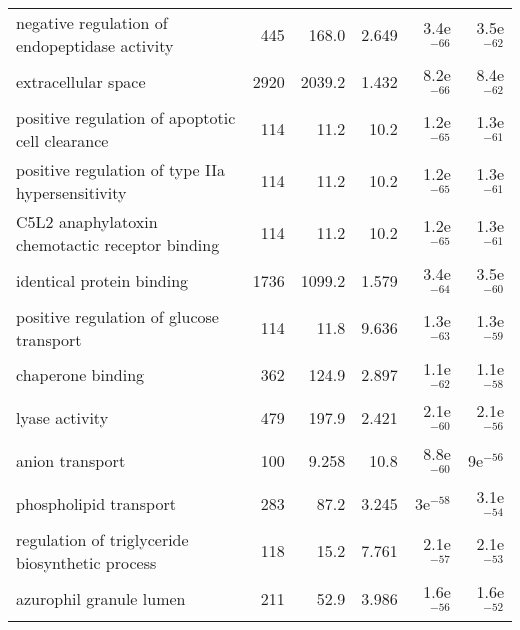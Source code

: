 \begin{longtable}{lrrrrr}
     negative regulation of endopeptidase activity &                     445 &                   168.0 &      2.649 &         3.4e$^{-66}$ &         3.5e$^{-62}$ \\
                               extracellular space &                    2920 &                  2039.2 &      1.432 &         8.2e$^{-66}$ &         8.4e$^{-62}$ \\
   positive regulation of apoptotic cell clearance &                     114 &                    11.2 &       10.2 &         1.2e$^{-65}$ &         1.3e$^{-61}$ \\
  positive regulation of type IIa hypersensitivity &                     114 &                    11.2 &       10.2 &         1.2e$^{-65}$ &         1.3e$^{-61}$ \\
   C5L2 anaphylatoxin chemotactic receptor binding &                     114 &                    11.2 &       10.2 &         1.2e$^{-65}$ &         1.3e$^{-61}$ \\
                         identical protein binding &                    1736 &                  1099.2 &      1.579 &         3.4e$^{-64}$ &         3.5e$^{-60}$ \\
          positive regulation of glucose transport &                     114 &                    11.8 &      9.636 &         1.3e$^{-63}$ &         1.3e$^{-59}$ \\
                                 chaperone binding &                     362 &                   124.9 &      2.897 &         1.1e$^{-62}$ &         1.1e$^{-58}$ \\
                                    lyase activity &                     479 &                   197.9 &      2.421 &         2.1e$^{-60}$ &         2.1e$^{-56}$ \\
                                   anion transport &                     100 &                   9.258 &       10.8 &         8.8e$^{-60}$ &           9e$^{-56}$ \\
                            phospholipid transport &                     283 &                    87.2 &      3.245 &           3e$^{-58}$ &         3.1e$^{-54}$ \\
   regulation of triglyceride biosynthetic process &                     118 &                    15.2 &      7.761 &         2.1e$^{-57}$ &         2.1e$^{-53}$ \\
                           azurophil granule lumen &                     211 &                    52.9 &      3.986 &         1.6e$^{-56}$ &         1.6e$^{-52}$ \\

\end{longtable}
